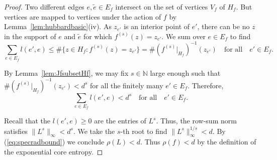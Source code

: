 \documentclass[12pt,oneside,a4]{amsart}
\newcommand{\IN}{\mathbb{N}}
\numberwithin{maincounter}{section}
\numberwithin{equation}{section}
\begin{document}
\begin{proof}
  Two different edges $e,\widetilde e\in E_f$ intersect on the set of
  vertices $V_f$ of $H_f$. But vertices are mapped to vertices under
  the action of $f$ by Lemma~\ref{lem:hubbardbasic}(iv).
  As $z_{e'}$ is
  an interior point of $e'$, there can be no  $z$ in the support of $e$ and
  $\widetilde e$ for which $f^{(s)}(z) = z_{e'}$.
  We sum over $e\in E_f$ to find
  \begin{equation*}
    \sum_{e\in E_f} l(e',e) \le \#\{ z\in H_f : f^{(s)}(z) = z_{e'}
    \} = \# (f^{(s)}|_{H_f})^{-1}(z_{e'})
    \quad\text{for all}\quad e'\in E_f.
  \end{equation*}

  By Lemma~\ref{lem:JfsubsetHf}, we may fix $s\in\IN$ large enough such
  that $\# (f^{(s)}|_{H_f})^{-1}(z_{e'}) < d^s$ for all the
  finitely many ${e'}\in E_f$. Therefore,
  \begin{equation*}
    \sum_{e\in E_f} l(e',e) < d^s    \quad\text{for all}\quad e'\in E_f.
  \end{equation*}
  
  Recall that the $l(e',e)\ge 0$ are the entries of $L^s$.
  Thus, the row-sum norm satisfies $\|L^s\|_\infty < d^s$. We take the
  $s$-th root to find $\|L^s\|_\infty^{1/s} < d$.  By
  (\ref{eq:specradbound}) we conclude $\rho(L) < d$.
  Thus $\rho(f)<d$ by the definition of the exponential core entropy.
\end{proof}
\end{document}
